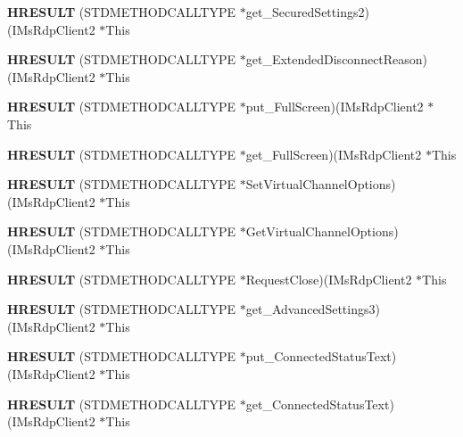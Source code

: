 \begin{DoxyCompactItemize}
{\bfseries H\+R\+E\+S\+U\+LT} (S\+T\+D\+M\+E\+T\+H\+O\+D\+C\+A\+L\+L\+T\+Y\+PE $\ast$get\+\_\+\+Secured\+Settings2)(I\+Ms\+Rdp\+Client2 $\ast$This
\item 
\mbox{\label{struct_i_ms_rdp_client2_vtbl_a9d12dfdd793f3d7ee528be53f8f39398}} 
{\bfseries H\+R\+E\+S\+U\+LT} (S\+T\+D\+M\+E\+T\+H\+O\+D\+C\+A\+L\+L\+T\+Y\+PE $\ast$get\+\_\+\+Extended\+Disconnect\+Reason)(I\+Ms\+Rdp\+Client2 $\ast$This
\item 
\mbox{\label{struct_i_ms_rdp_client2_vtbl_abdb55699d58389a45ea7dbe0a3e3c016}} 
{\bfseries H\+R\+E\+S\+U\+LT} (S\+T\+D\+M\+E\+T\+H\+O\+D\+C\+A\+L\+L\+T\+Y\+PE $\ast$put\+\_\+\+Full\+Screen)(I\+Ms\+Rdp\+Client2 $\ast$This
\item 
\mbox{\label{struct_i_ms_rdp_client2_vtbl_ad623a42b0f38b1e9bde54136a8decb11}} 
{\bfseries H\+R\+E\+S\+U\+LT} (S\+T\+D\+M\+E\+T\+H\+O\+D\+C\+A\+L\+L\+T\+Y\+PE $\ast$get\+\_\+\+Full\+Screen)(I\+Ms\+Rdp\+Client2 $\ast$This
\item 
\mbox{\label{struct_i_ms_rdp_client2_vtbl_abff2e7f17d793f3d0a2c7baf4be516ec}} 
{\bfseries H\+R\+E\+S\+U\+LT} (S\+T\+D\+M\+E\+T\+H\+O\+D\+C\+A\+L\+L\+T\+Y\+PE $\ast$Set\+Virtual\+Channel\+Options)(I\+Ms\+Rdp\+Client2 $\ast$This
\item 
\mbox{\label{struct_i_ms_rdp_client2_vtbl_ad28e230998f3c3ebc86d0c0246ab9383}} 
{\bfseries H\+R\+E\+S\+U\+LT} (S\+T\+D\+M\+E\+T\+H\+O\+D\+C\+A\+L\+L\+T\+Y\+PE $\ast$Get\+Virtual\+Channel\+Options)(I\+Ms\+Rdp\+Client2 $\ast$This
\item 
\mbox{\label{struct_i_ms_rdp_client2_vtbl_ab6b6c9e6fdbfd572b20f13836c0b256a}} 
{\bfseries H\+R\+E\+S\+U\+LT} (S\+T\+D\+M\+E\+T\+H\+O\+D\+C\+A\+L\+L\+T\+Y\+PE $\ast$Request\+Close)(I\+Ms\+Rdp\+Client2 $\ast$This
\item 
\mbox{\label{struct_i_ms_rdp_client2_vtbl_a99d2046db065076208b614f14e604c7e}} 
{\bfseries H\+R\+E\+S\+U\+LT} (S\+T\+D\+M\+E\+T\+H\+O\+D\+C\+A\+L\+L\+T\+Y\+PE $\ast$get\+\_\+\+Advanced\+Settings3)(I\+Ms\+Rdp\+Client2 $\ast$This
\item 
\mbox{\label{struct_i_ms_rdp_client2_vtbl_af0cf526ec00bad7dfc45b83781e83d67}} 
{\bfseries H\+R\+E\+S\+U\+LT} (S\+T\+D\+M\+E\+T\+H\+O\+D\+C\+A\+L\+L\+T\+Y\+PE $\ast$put\+\_\+\+Connected\+Status\+Text)(I\+Ms\+Rdp\+Client2 $\ast$This
\item 
\mbox{\label{struct_i_ms_rdp_client2_vtbl_a75dbbb19ec1f065e356764d5899e878a}} 
{\bfseries H\+R\+E\+S\+U\+LT} (S\+T\+D\+M\+E\+T\+H\+O\+D\+C\+A\+L\+L\+T\+Y\+PE $\ast$get\+\_\+\+Connected\+Status\+Text)(I\+Ms\+Rdp\+Client2 $\ast$This
\end{DoxyCompactItemize}
